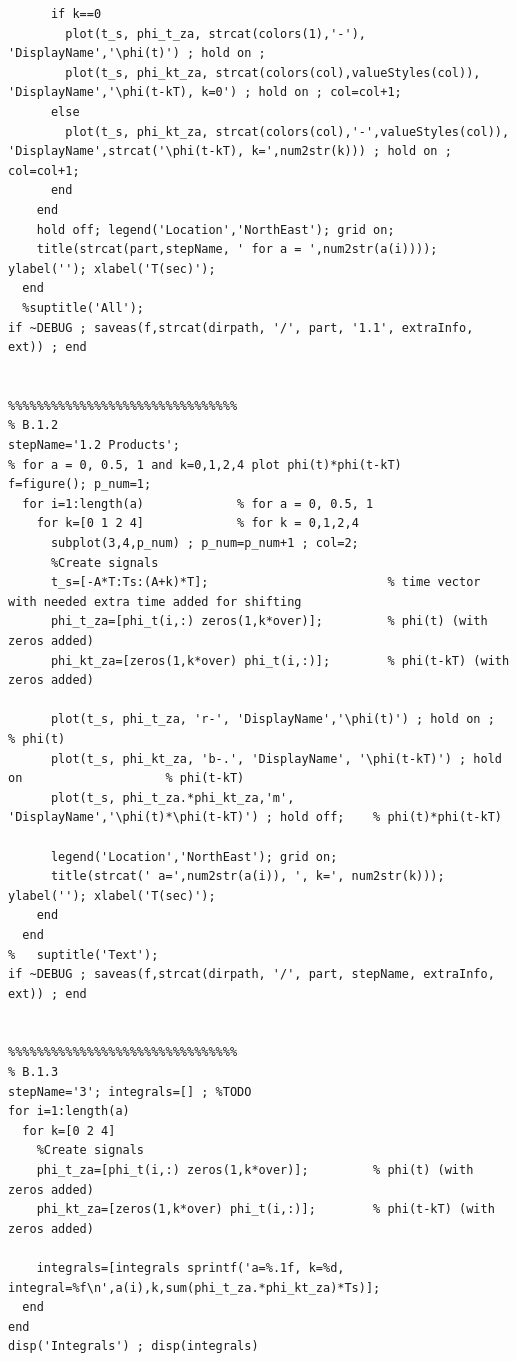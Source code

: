 \documentclass[11pt]{article}
\begin{document}
\begin{lstlisting}[caption = {\texttt{part\_b.m}}]
      % Plot once initial signal then plot others
      if k==0 
        plot(t_s, phi_t_za, strcat(colors(1),'-'), 'DisplayName','\phi(t)') ; hold on ; 
        plot(t_s, phi_kt_za, strcat(colors(col),valueStyles(col)), 'DisplayName','\phi(t-kT), k=0') ; hold on ; col=col+1; 
      else
        plot(t_s, phi_kt_za, strcat(colors(col),'-',valueStyles(col)), 'DisplayName',strcat('\phi(t-kT), k=',num2str(k))) ; hold on ; col=col+1; 
      end
    end
    hold off; legend('Location','NorthEast'); grid on;
    title(strcat(part,stepName, ' for a = ',num2str(a(i)))); ylabel(''); xlabel('T(sec)'); 
  end
  %suptitle('All');
if ~DEBUG ; saveas(f,strcat(dirpath, '/', part, '1.1', extraInfo, ext)) ; end


%%%%%%%%%%%%%%%%%%%%%%%%%%%%%%%%
% B.1.2
stepName='1.2 Products'; 
% for a = 0, 0.5, 1 and k=0,1,2,4 plot phi(t)*phi(t-kT)
f=figure(); p_num=1;
  for i=1:length(a)             % for a = 0, 0.5, 1
    for k=[0 1 2 4]             % for k = 0,1,2,4
      subplot(3,4,p_num) ; p_num=p_num+1 ; col=2;
      %Create signals
      t_s=[-A*T:Ts:(A+k)*T];                         % time vector with needed extra time added for shifting
      phi_t_za=[phi_t(i,:) zeros(1,k*over)];         % phi(t) (with zeros added)
      phi_kt_za=[zeros(1,k*over) phi_t(i,:)];        % phi(t-kT) (with zeros added)
      
      plot(t_s, phi_t_za, 'r-', 'DisplayName','\phi(t)') ; hold on ;                        % phi(t) 
      plot(t_s, phi_kt_za, 'b-.', 'DisplayName', '\phi(t-kT)') ; hold on                    % phi(t-kT)
      plot(t_s, phi_t_za.*phi_kt_za,'m', 'DisplayName','\phi(t)*\phi(t-kT)') ; hold off;    % phi(t)*phi(t-kT) 
      
      legend('Location','NorthEast'); grid on;
      title(strcat(' a=',num2str(a(i)), ', k=', num2str(k))); ylabel(''); xlabel('T(sec)'); 
    end
  end
%   suptitle('Text');
if ~DEBUG ; saveas(f,strcat(dirpath, '/', part, stepName, extraInfo, ext)) ; end


%%%%%%%%%%%%%%%%%%%%%%%%%%%%%%%%
% B.1.3
stepName='3'; integrals=[] ; %TODO
for i=1:length(a)
  for k=[0 2 4]
    %Create signals
    phi_t_za=[phi_t(i,:) zeros(1,k*over)];         % phi(t) (with zeros added)
    phi_kt_za=[zeros(1,k*over) phi_t(i,:)];        % phi(t-kT) (with zeros added)
  
    integrals=[integrals sprintf('a=%.1f, k=%d, integral=%f\n',a(i),k,sum(phi_t_za.*phi_kt_za)*Ts)];
  end
end
disp('Integrals') ; disp(integrals)
\end{lstlisting}
\end{document}
